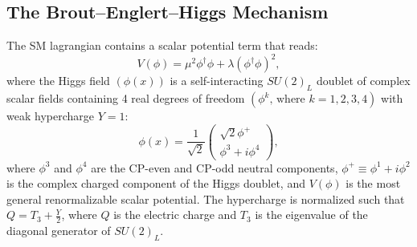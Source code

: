


\subsection{The Brout--Englert--Higgs Mechanism}
\label{sec:higgs_mech}

The SM lagrangian contains a scalar potential term that reads:
\begin{equation}
    V (\phi) = \mu^2\phi^\dagger\phi + \lambda(\phi^\dagger\phi)^2,
    \label{eqn:scalar_pot}
\end{equation}
where the Higgs field $\left( \phi(x) \right)$ is a self-interacting $SU(2)_L$ doublet of complex scalar fields containing 4 real degrees of freedom $\left( \phi^k \text{, where } k=1, 2, 3, 4 \right)$ with weak hypercharge $Y = 1$:
\begin{equation}
    \phi(x) = \frac{1}{\sqrt{2}}
    \begin{pmatrix}
        \sqrt{2}\phi^+ \\
        \phi^3 + i\phi^4
    \end{pmatrix},
    \label{eqn:higgs_doublet}
\end{equation}
where $\phi^3$ and $\phi^4$ are the CP-even and CP-odd neutral components, $\phi^+ \equiv \phi^1 + i \phi^2$ is the complex charged component of the Higgs doublet, and $V(\phi)$ is the most general renormalizable scalar potential.
The hypercharge is normalized such that $Q = T_{3} + \frac{Y}{2}$, where $Q$ is the electric charge and $T_{3}$ is the eigenvalue of the diagonal generator of $SU(2)_L$.

